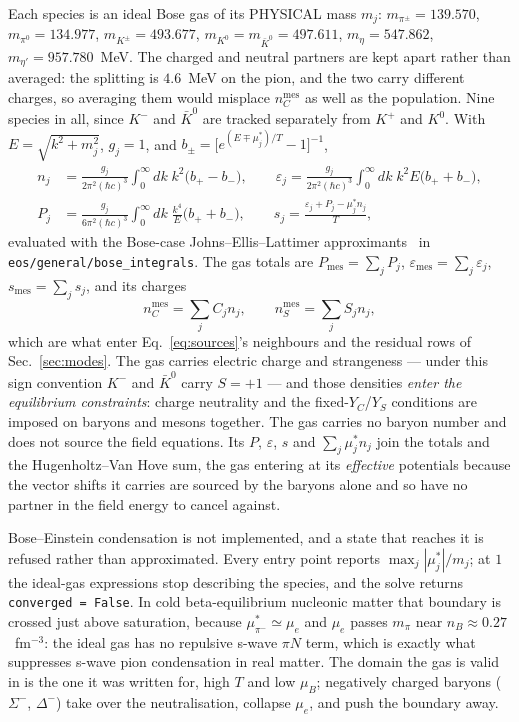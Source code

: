 \documentclass[aps,prc,onecolumn,superscriptaddress,nofootinbib,10pt]{revtex4-2}
\newcommand{\nB}{n_B}
\newcommand{\muB}{\mu_B}
\begin{document}
Each species is an ideal Bose gas of its PHYSICAL mass $m_j$: $m_{\pi^\pm} =
139.570$, $m_{\pi^0} = 134.977$, $m_{K^\pm} = 493.677$, $m_{K^0} =
m_{\bar K^0} = 497.611$, $m_\eta = 547.862$, $m_{\eta'} = 957.780$~MeV. The
charged and neutral partners are kept apart rather than averaged: the
splitting is $4.6$~MeV on the pion, and the two carry different charges, so
averaging them would misplace $n_C^{\mathrm{mes}}$ as well as the population.
Nine species in all, since $K^-$ and $\bar K^0$ are tracked separately from
$K^+$ and $K^0$. With $E = \sqrt{k^2 + m_j^2}$, $g_j = 1$, and
$b_\pm = \big[ e^{(E \mp \mu^{*}_j)/T} - 1 \big]^{-1}$,
%
\begin{align}
n_j &= \frac{g_j}{2\pi^2 (\hbar c)^3} \int_0^\infty \!\! dk\; k^2
       \big( b_+ - b_- \big) ,
\qquad
\varepsilon_j = \frac{g_j}{2\pi^2 (\hbar c)^3} \int_0^\infty \!\! dk\; k^2 E
       \big( b_+ + b_- \big) ,
\nonumber\\
P_j &= \frac{g_j}{6\pi^2 (\hbar c)^3} \int_0^\infty \!\! dk\;
       \frac{k^4}{E} \big( b_+ + b_- \big) ,
\qquad
s_j = \frac{\varepsilon_j + P_j - \mu^{*}_j n_j}{T} ,
\label{eq:bose}
\end{align}
%
evaluated with the Bose-case Johns--Ellis--Lattimer
approximants~\cite{JohnsEllisLattimer1996} in
\texttt{eos/general/bose\_integrals}. The gas totals are
$P_{\mathrm{mes}} = \sum_j P_j$, $\varepsilon_{\mathrm{mes}} = \sum_j
\varepsilon_j$, $s_{\mathrm{mes}} = \sum_j s_j$, and its charges
%
\begin{equation}
n_C^{\mathrm{mes}} = \sum_j C_j n_j , \qquad
n_S^{\mathrm{mes}} = \sum_j S_j n_j ,
\label{eq:gascharges}
\end{equation}
%
which are what enter Eq.~\eqref{eq:sources}'s neighbours and the residual rows
of Sec.~\ref{sec:modes}. The gas carries electric
charge and strangeness --- under this sign convention $K^-$ and $\bar K^0$
carry $S=+1$ --- and those densities \emph{enter the equilibrium
constraints}: charge neutrality and the fixed-$Y_C$/$Y_S$ conditions are
imposed on baryons and mesons together. The gas carries no baryon number and
does not source the field equations. Its $P$, $\varepsilon$, $s$ and
$\sum_j \mu^{*}_j n_j$ join the totals and the Hugenholtz--Van Hove sum, the
gas entering at its \emph{effective} potentials because the vector shifts it
carries are sourced by the baryons alone and so have no partner in the field
energy to cancel against.

Bose--Einstein condensation is not implemented, and a state that reaches it is
refused rather than approximated. Every entry point reports
$\max_j |\mu^{*}_j| / m_j$; at $1$ the ideal-gas expressions stop describing
the species, and the solve returns \texttt{converged = False}. In cold
beta-equilibrium nucleonic matter that boundary is crossed just above
saturation, because $\mu^{*}_{\pi^-} \simeq \mu_e$ and $\mu_e$ passes
$m_\pi$ near $\nB \approx 0.27$~fm$^{-3}$: the ideal gas has no repulsive
s-wave $\pi N$ term, which is exactly what suppresses s-wave pion condensation
in real matter. The domain the gas is valid in is the one it was written for,
high $T$ and low $\muB$; negatively charged baryons ($\Sigma^-$, $\Delta^-$)
take over the neutralisation, collapse $\mu_e$, and push the boundary away.
\end{document}
